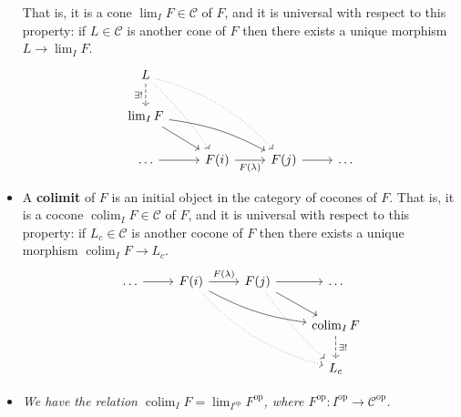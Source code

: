 \documentclass[10pt]{article}
\newcommand{\ccat}{\mathcal{C}}
\newcommand{\op}[1]{{#1}^\text{op}}
\DeclareMathOperator*{\colim}{colim}
\begin{document}
\begin{itemize}
                        That is, it is a cone $\lim_I F\in\ccat$ of $F$, and it is universal with respect to this property: if $L\in\ccat$ is another cone of $F$ then there exists a unique morphism $L\to\lim_I F$.
                        \begin{equation*}
                            \begin{tikzcd}
                                L \ar[dashed]{d}[swap]{\exists!} \ar[dotted, bend left=5]{ddr} \ar[dotted, bend left=15]{ddrr}
                                &
                                &
                                &\\
                                \lim_I F \ar{dr} \ar[bend left=10]{drr}
                                &
                                &
                                &\\
                                \ldots \rar
                                & F(i) \rar[swap]{F(\lambda)}
                                & F(j) \rar
                                & \ldots
                            \end{tikzcd}
                        \end{equation*}
                    \item A \textbf{colimit} of $F$ is an initial object in the category of cocones of $F$.
                        That is, it is a cocone $\colim_I F\in\ccat$ of $F$, and it is universal with respect to this property: if $L_c\in\ccat$ is another cocone of $F$ then there exists a unique morphism $\colim_I F\to L_c$.
                        \begin{equation*}
                            \begin{tikzcd}
                                \ldots \rar
                                & F(i) \rar{F(\lambda)} \ar[bend right=10]{drr} \ar[dotted, bend right=15]{ddrr}
                                & F(j) \rar \ar{dr} \ar[dotted, bend right=5]{ddr}
                                & \ldots\\
                                &
                                &
                                &
                                \colim_I F \ar[dashed]{d}{\exists!}\\
                                &
                                &
                                &
                                L_c
                            \end{tikzcd}
                        \end{equation*}
                    \item \emph{We have the relation $\colim_I F=\lim_{\op{I}}\op{F}$, where $\op{F}\colon\op{I}\to\op{\ccat}$.}
                \end{itemize}
\end{document}

